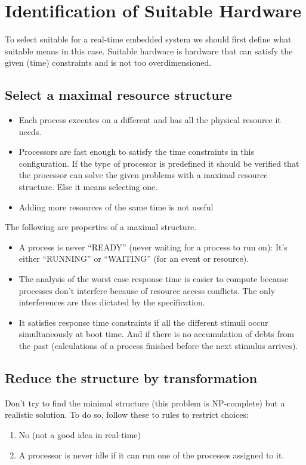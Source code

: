 

\chapter{Identification of Suitable Hardware}
To select suitable  for a real-time embedded system we should first define what suitable means in this case. Suitable hardware is hardware that can satisfy the given (time) constraints and is not too overdimensioned.

\section{Select a maximal resource structure}

\begin{itemize}
	\item Each process executes on a different  and has all the physical resource it needs.
	\item Processors are fast enough to satisfy the time constraints in this configuration. If the type of processor is predefined it should be verified that the processor can solve the given problems with a maximal resource structure. Else it means selecting one.
	\item Adding more resources of the same time is not useful
\end{itemize}

The following are properties of a maximal  structure.
\begin{itemize}
	\item A process is never ``READY'' (never waiting for a process to run on): It's either ``RUNNING'' or ``WAITING'' (for an event or resource).
	\item The analysis of the worst case response time is easier to compute because processes don't interfere because of resource access conflicts. The only interferences are thos dictated by the specification.
	\item It satisfies response time constraints if all the different stimuli occur simultaneously at boot time. And if there is no accumulation of debts from the past (calculations of a process finished before the next stimulus arrives).
\end{itemize}

\section{Reduce the structure by transformation}
Don't try to find the minimal structure (this problem is NP-complete) but a realistic solution. To do so, follow these to rules to restrict choices:
\begin{enumerate}
	\item No  (not a good idea in real-time)
	\item A processor is never idle if it can run one of the processes assigned to it.
\end{enumerate}

